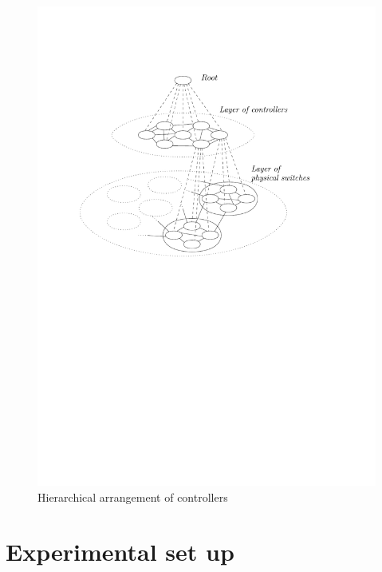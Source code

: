 \documentclass[a0,portrait]{a0poster}
\begin{document}
\begin{multicols}{2}
\begin{figure}[H]
\centering
\includegraphics[scale=2]{hierarchy}
\caption{Hierarchical arrangement of controllers}
\label{fig:hierarchy}
\end{figure}







\section*{Experimental set up}


\end{multicols}
\end{document}
